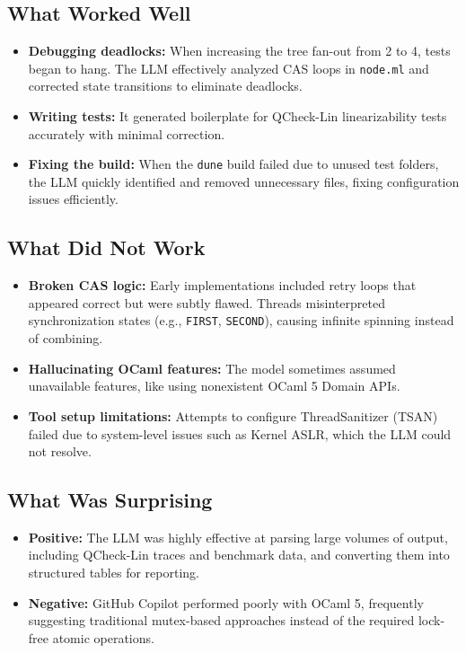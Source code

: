 \documentclass[11pt,a4paper]{article}
\begin{document}
\subsection*{What Worked Well}
\begin{itemize}
    \item \textbf{Debugging deadlocks:} When increasing the tree fan-out from 2 to 4, tests began to hang. The LLM effectively analyzed CAS loops in \texttt{node.ml} and corrected state transitions to eliminate deadlocks.
    
    \item \textbf{Writing tests:} It generated boilerplate for QCheck-Lin linearizability tests accurately with minimal correction.
    
    \item \textbf{Fixing the build:} When the \texttt{dune} build failed due to unused test folders, the LLM quickly identified and removed unnecessary files, fixing configuration issues efficiently.
\end{itemize}

\subsection*{What Did Not Work}

\begin{itemize}
    \item \textbf{Broken CAS logic:} Early implementations included retry loops that appeared correct but were subtly flawed. Threads misinterpreted synchronization states (e.g., \texttt{FIRST}, \texttt{SECOND}), causing infinite spinning instead of combining.
    
    \item \textbf{Hallucinating OCaml features:} The model sometimes assumed unavailable features, like using nonexistent OCaml 5 Domain APIs.
    
    \item \textbf{Tool setup limitations:} Attempts to configure ThreadSanitizer (TSAN) failed due to system-level issues such as Kernel ASLR, which the LLM could not resolve.
\end{itemize}

\subsection*{What Was Surprising}

\begin{itemize}
    \item \textbf{Positive:} The LLM was highly effective at parsing large volumes of output, including QCheck-Lin traces and benchmark data, and converting them into structured tables for reporting.
    
    \item \textbf{Negative:} GitHub Copilot performed poorly with OCaml 5, frequently suggesting traditional mutex-based approaches instead of the required lock-free atomic operations.
\end{itemize}
\end{document}

